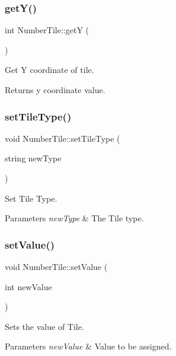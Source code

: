 \subsubsection{\texorpdfstring{get\+Y()}{getY()}}
{\footnotesize\ttfamily int Number\+Tile\+::getY (\begin{DoxyParamCaption}{ }\end{DoxyParamCaption})}

Get Y coordinate of tile.

\begin{DoxyReturn}{Returns}
y coordinate value. 
\end{DoxyReturn}
\mbox{\label{classNumberTile_aee2c091b10b1c2f457003c59ad233535}} 
\subsubsection{\texorpdfstring{set\+Tile\+Type()}{setTileType()}}
{\footnotesize\ttfamily void Number\+Tile\+::set\+Tile\+Type (\begin{DoxyParamCaption}\item[{string}]{new\+Type }\end{DoxyParamCaption})}

Set Tile Type.


\begin{DoxyParams}{Parameters}
{\em new\+Type} & The Tile type. \\
\hline
\end{DoxyParams}
\mbox{\label{classNumberTile_afdcd9ba36599ad5c7c8788fdb9d31352}} 
\subsubsection{\texorpdfstring{set\+Value()}{setValue()}}
{\footnotesize\ttfamily void Number\+Tile\+::set\+Value (\begin{DoxyParamCaption}\item[{int}]{new\+Value }\end{DoxyParamCaption})}

Sets the value of Tile.


\begin{DoxyParams}{Parameters}
{\em new\+Value} & Value to be assigned. \\
\hline
\end{DoxyParams}
\mbox{\label{classNumberTile_aaa040ff3410c3722b29af28f8f9752e4}} 
